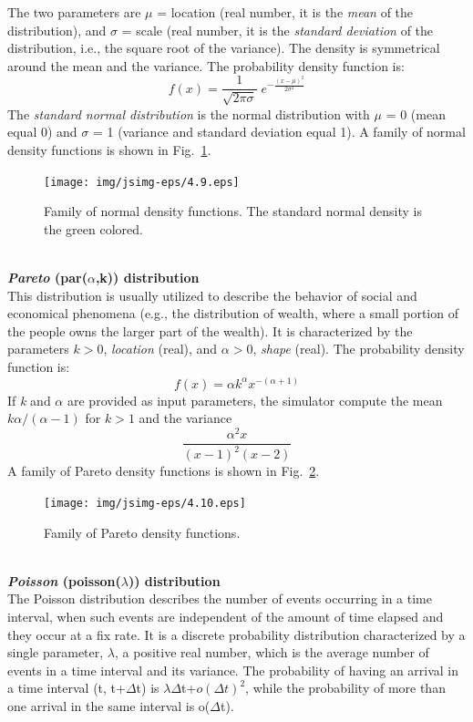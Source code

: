The two parameters are $\mu$ = location (real number, it is the
\emph{mean} of the distribution), and $\sigma$ = scale (real
number, it is the \emph{standard deviation} of the distribution,
i.e., the square root of the variance). The density is symmetrical
around the mean and the variance. The probability density function
is:
\[
f(x) = \frac{1}{\sqrt{2 \pi \sigma}} \; e^{-\frac{(x-\mu)^2}{2
\sigma^2}}
\]
 The \emph{standard normal distribution} is the normal
distribution with $\mu$ = 0 (mean equal 0) and $\sigma$ = 1
(variance and standard deviation equal 1). A family of normal
density functions is shown in Fig.~\ref{fig:famNorm}.
\begin{figure}[htb]
    \begin{center}
        \texttt{[image: img/jsimg-eps/4.9.eps]}
    \end{center}
    \caption{Family of normal density functions. The
standard normal density is the green colored.}
    \label{fig:famNorm}
\end{figure}\\

\textbf{\emph{Pareto} (par($\alpha$,k)) distribution}\\
 This
distribution is usually utilized to describe the behavior of
social and economical phenomena (e.g., the distribution of wealth,
where a small portion of the people owns the larger part of the
wealth). It is characterized by the parameters $k>0$, \emph{location}
(real), and $\alpha>0$, \emph{shape} (real). The probability density
function is:
\[ f(x) = \alpha k^\alpha x^{-(\alpha + 1)  }
\]
If \emph{k} and $\alpha$ are provided as input parameters, the simulator
compute the mean  $k \alpha/(\alpha - 1)$ for $k>1$ and the
variance
\[ \frac{\alpha^2 x }{(x-1)^2 (x-2)}
\]
A family of Pareto density functions is shown in
Fig.~\ref{fig:famPar}.
\begin{figure}[htb]
    \begin{center}
        \texttt{[image: img/jsimg-eps/4.10.eps]}
    \end{center}
    \caption{Family of Pareto density functions.}
    \label{fig:famPar}
\end{figure}\\

\textbf{\emph{Poisson} (poisson($\lambda$)) distribution}\\
The Poisson distribution describes the number of events occurring
in a time interval, when such events are independent of the amount
of time elapsed and they occur at a fix rate. It is a discrete
probability distribution characterized by a single parameter,
$\lambda$, a positive real number, which is the average number of
events in a time interval and its variance. The probability of
having an arrival in a time interval (t, t+$\Delta$t) is $\lambda
\Delta$t+{$o(\Delta t)^2$}, while the probability of more than one
arrival in the same interval is o($\Delta$t).

